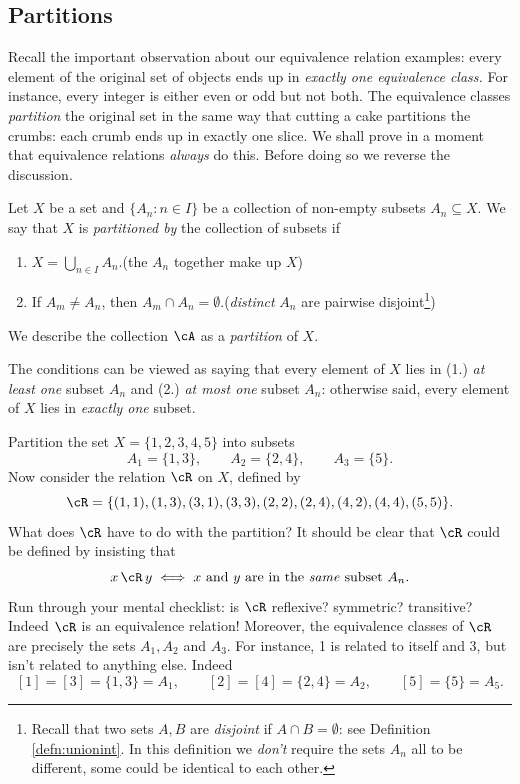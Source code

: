 \subsection{Partitions}

Recall the important observation about our equivalence relation examples: every element of the original set of objects ends up in \emph{exactly one equivalence class.} For instance, every integer is either even or odd but not both. The equivalence classes \emph{partition} the original set in the same way that cutting a cake partitions the crumbs: each crumb ends up in exactly one slice. We shall prove in a moment that equivalence relations \emph{always} do this. Before doing so we reverse the discussion.

\begin{defn}\label{defn:partition}
Let $X$ be a set and $\{A_n:n\in I\}$ be a collection of non-empty subsets $A_n\subseteq X$. We say that $X$ is \emph{partitioned by} the collection of subsets if
\begin{enumerate}
\item $X=\bigcup\limits_{n\in I}A_n$.\hfill(the $A_n$ together make up $X$)\\[-10pt]
\item If $A_m\neq A_n$, then $A_m\cap A_n=\emptyset$.\hfill(\emph{distinct} $A_n$ are pairwise disjoint\footnote{Recall that two sets $A,B$ are \emph{disjoint} if $A\cap B=\emptyset$: see Definition \ref{defn:unionint}. In this definition we \emph{don't} require the sets $A_n$ all to be different, some could be identical to each other.})
\end{enumerate}
We describe the collection $\cA$ as a \emph{partition} of $X$.
\end{defn}

\noindent The conditions can be viewed as saying that every element of $X$ lies in (1.) \emph{at least one} subset $A_n$ and (2.) \emph{at most one} subset $A_n$: otherwise said, every element of $X$ lies in \emph{exactly one} subset.

\begin{example}
Partition the set $X=\{1,2,3,4,5\}$ into subsets
\[A_1=\{1,3\},\qquad A_2=\{2,4\},\qquad A_3=\{5\}.\]
Now consider the relation $\cR$ on $X$, defined by
\[\cR=\{(1,1),(1,3),(3,1),(3,3),(2,2),(2,4),(4,2),(4,4),(5,5)\}.\]
What does $\cR$ have to do with the partition? It should be clear that $\cR$ could be defined by insisting that
\[x\,\cR\,y\iff \text{$x$ and $y$ are in the \emph{same} subset $A_n$.}\]
Run through your mental checklist: is $\cR$ reflexive? symmetric? transitive? Indeed $\cR$ is an equivalence relation! Moreover, the equivalence classes of $\cR$ are precisely the sets $A_1,A_2$ and $A_3$. For instance, 1 is related to itself and 3, but isn't related to anything else. Indeed
\[[1]=[3]=\{1,3\}=A_1,\qquad [2]=[4]=\{2,4\}=A_2,\qquad [5]=\{5\}=A_5.\]
\end{example} 


